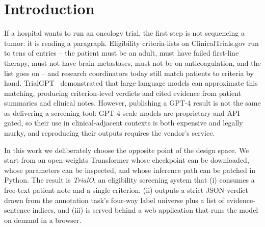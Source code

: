 \documentclass[conference]{IEEEtran}
\newcommand{\draftname}{\texttt{google/gemma-3n-E2B-it}}
\begin{document}
\begin{abstract}
profile than the fused SDPA kernel; and (iii) greedy speculative decoding
with an \draftname{} draft model whose measured speed
\emph{degrades} to 0.56$\times$ baseline despite architectural validity,
and we explain this slowdown by decomposing step-cost into a
measured 0.885 draft-cost share and an acceptance rate ceiling of 0.69.
We deliver a browser-based application (FastAPI backend, React
frontend) that runs the full screening -- criterion-by-criterion
verdicts, cited evidence, aggregate verdict by explicit rule,
and a ``decode benchmark'' that exercises all three implemented
decoding paths live -- and exports a machine-readable PDF trial
screening report with provenance metadata. Data, code, checkpoints,
split manifest, and build instructions are available at
\url{https://github.com/murgi/trialo}.

\vspace{3pt}
\noindent\textbf{Keywords}---clinical trial eligibility, structured
prediction, patient-criterion matching, low-rank adaptation, KV cache,
tiled attention, online softmax, speculative decoding, open-weights
Transformer, educational screening tool.
\end{abstract}

\section{Introduction}
\label{sec:intro}

If a hospital wants to run an oncology trial, the first step is not
sequencing a tumor: it is reading a paragraph. Eligibility criteria-lists
on ClinicalTrials.gov run to tens of entries -- the patient must be an
adult, must have failed first-line therapy, must not have brain
metastases, must not be on anticoagulation, and the list goes on -- and
research coordinators today still match patients to criteria by hand.
TrialGPT~\cite{id1} demonstrated that large language models can
approximate this matching, producing criterion-level verdicts and
cited evidence from patient summaries and clinical notes. However,
publishing a GPT-4 result is not the same as delivering a screening
tool: GPT-4-scale models are proprietary and API-gated, so their use
in clinical-adjacent contexts is both expensive and legally murky, and
reproducing their outputs requires the vendor's service.

In this work we deliberately choose the opposite point of the design
space. We start from an open-weights Transformer whose checkpoint can
be downloaded, whose parameters can be inspected, and whose inference
path can be patched in Python. The result is \emph{TrialO}, an
eligibility screening system that (i) consumes a free-text patient
note and a single criterion, (ii) outputs a strict JSON verdict drawn
from the annotation task's four-way label universe plus a list of
evidence-sentence indices, and (iii) is served behind a web
application that runs the model on demand in a browser.
\end{document}
